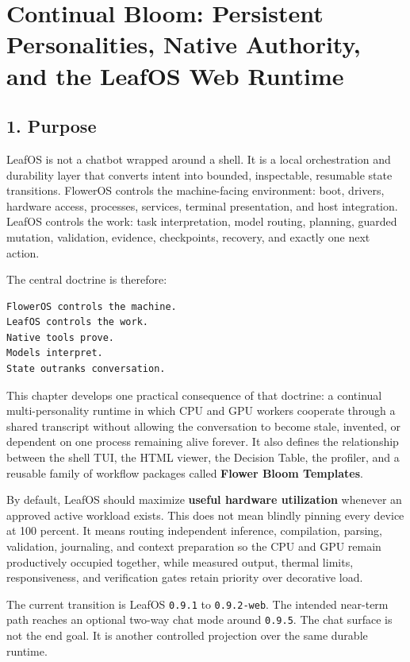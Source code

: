 \section{Continual Bloom: Persistent Personalities, Native Authority, and the LeafOS Web Runtime}

\subsection{1. Purpose}

LeafOS is not a chatbot wrapped around a shell. It is a local orchestration and
durability layer that converts intent into bounded, inspectable, resumable state
transitions. FlowerOS controls the machine-facing environment: boot, drivers,
hardware access, processes, services, terminal presentation, and host
integration. LeafOS controls the work: task interpretation, model routing,
planning, guarded mutation, validation, evidence, checkpoints, recovery, and
exactly one next action.

The central doctrine is therefore:

\begin{verbatim}
FlowerOS controls the machine.
LeafOS controls the work.
Native tools prove.
Models interpret.
State outranks conversation.
\end{verbatim}

This chapter develops one practical consequence of that doctrine: a continual
multi-personality runtime in which CPU and GPU workers cooperate through a
shared transcript without allowing the conversation to become stale, invented,
or dependent on one process remaining alive forever. It also defines the
relationship between the shell TUI, the HTML viewer, the Decision Table, the
profiler, and a reusable family of workflow packages called \textbf{Flower Bloom
Templates}.

By default, LeafOS should maximize \textbf{useful hardware utilization} whenever an
approved active workload exists. This does not mean blindly pinning every device
at 100 percent. It means routing independent inference, compilation, parsing,
validation, journaling, and context preparation so the CPU and GPU remain
productively occupied together, while measured output, thermal limits,
responsiveness, and verification gates retain priority over decorative load.

The current transition is LeafOS \texttt{0.9.1} to \texttt{0.9.2-web}. The intended near-term
path reaches an optional two-way chat mode around \texttt{0.9.5}. The chat surface is
not the end goal. It is another controlled projection over the same durable
runtime.

